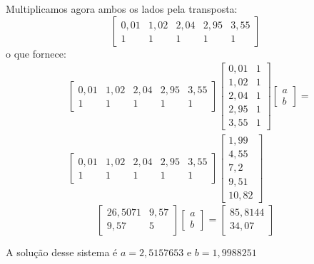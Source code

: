 \documentclass[main.tex]{subfiles}
\begin{document}
\begin{sol}
Multiplicamos agora ambos os lados pela transposta:
\begin{equation*}
\left[\begin{array}{ccccc}
0,01 &1,02 &2,04 &2,95 &3,55\\
1 &1 &1 &1 &1
\end{array}
\right]
\end{equation*}
o que fornece:
\begin{align*}
&\left[\begin{array}{ccccc}
0,01 &1,02 &2,04 &2,95 &3,55\\
1 &1 &1 &1 &1
\end{array}
\right]
\left[\begin{array}{cc}
0,01 &1\\
1,02 &1\\
2,04 &1\\
2,95 &1\\
3,55 &1
\end{array}
\right]
\left[\begin{array}{c}
a\\
b
\end{array}
\right]
=\\
&\left[\begin{array}{ccccc}
0,01 &1,02 &2,04 &2,95 &3,55\\
1 &1 &1 &1 &1
\end{array}
\right]
\left[\begin{array}{c}
1,99\\
4,55\\
7,2\\
9,51\\
10,82
\end{array}
\right]  
\end{align*}
$$\left[
\begin{array}{cc}
26,5071  & 9,57 \\
  9,57  &     5
\end{array}
\right]
\left[
\begin{array}{c}
a   \\
b
\end{array}
\right]=
\left[
\begin{array}{c}
85,8144  \\
34,07
\end{array}
\right]
$$

A solução desse sistema é $a=2,5157653$ e $b=1,9988251$


\end{sol}
\end{document}
